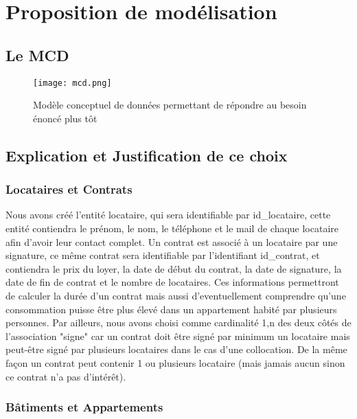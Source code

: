 \chapter{Proposition de modélisation}

\section{Le MCD}

\begin{figure}[!h]
\begin{center}
\texttt{[image: mcd.png]}
\end{center}
\caption{Modèle conceptuel de données permettant de répondre au besoin énoncé plus tôt}
\end{figure}

\section{Explication et Justification de ce choix}

\subsection{Locataires et Contrats}

Nous avons créé l’entité locataire, qui sera identifiable par id\_locataire, cette entité contiendra le prénom, le nom, le téléphone et le mail de chaque locataire afin d’avoir leur contact complet. Un contrat est associé à un locataire par une signature, ce même contrat sera identifiable par l’identifiant id\_contrat, et contiendra le prix du loyer, la date de début du contrat, la date de signature, la date de fin de contrat et le nombre de locataires. Ces informations permettront de calculer la durée d’un contrat mais aussi d'eventuellement comprendre qu'une consommation puisse être plus élevé dans un appartement habité par plusieurs personnes. Par ailleurs, nous avons choisi comme cardinalité 1,n des deux côtés de l'association "signe" car un contrat doit être signé par minimum un locataire mais peut-être signé par plusieurs locataires dans le cas d'une collocation. De la même façon un contrat peut contenir 1 ou plusieurs locataire (mais jamais aucun sinon ce contrat n'a pas d'intérêt).

\subsection{Bâtiments et Appartements}

